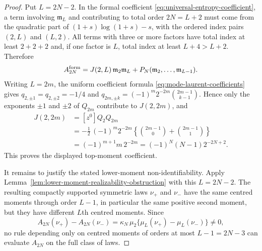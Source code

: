 \ifdefined\JFAArticleMain
{}
\else
\begin{proof}
Put \(L=2N-2\).  In the formal coefficient
\eqref{eq:universal-entropy-coefficient}, a term involving
\(\mathfrak m_L\) and contributing to total order \(2N=L+2\) must come from
the quadratic part of
\((1+s)\log(1+s)-s\), with the ordered index pairs \((2,L)\) and \((L,2)\).
All terms with three or more factors have total index at least \(2+2+2\) and,
if one factor is \(L\), total index at least \(L+4> L+2\).  Therefore
\[
  A_{2N}^{\rm form}
  =J(2,L)\,\mathfrak m_2\mathfrak m_L
  +P_N(\mathfrak m_2,\ldots,\mathfrak m_{L-1}).
\]
Writing \(L=2m\), the uniform coefficient formula
\eqref{eq:mode-laurent-coefficients} gives
\(q_{2,\pm1}=q_{2,\pm2}=-1/4\) and
\(q_{2m,\pm k}=(-1)^m2^{-2m}\binom{2m-1}{k-1}\).  Hence only the exponents
\(\pm1\) and \(\pm2\) of \(Q_{2m}\) contribute to \(J(2,2m)\), and
\[
\begin{aligned}
J(2,2m)
&=[z^0]Q_2Q_{2m}  \\
&=-\frac12\,(-1)^m2^{-2m}
\left\{\binom{2m-1}{0}+\binom{2m-1}{1}\right\}  \\
&=(-1)^{m+1}m\,2^{-2m}
=(-1)^N(N-1)2^{-2N+2}.
\end{aligned}
\]
This proves the displayed top-moment coefficient.

It remains to justify the stated lower-moment non-identifiability.  Apply
Lemma~\ref{lem:lower-moment-realizability-obstruction} with this
\(L=2N-2\).  The resulting compactly supported symmetric laws \(\nu_+\) and
\(\nu_-\) have the same centred moments through order \(L-1\), in particular
the same positive second moment, but they have different \(L\)th centred
moments.  Since
\[
  A_{2N}(\nu_+)-A_{2N}(\nu_-)
  =\kappa_N\,\mu_2\{\mu_L(\nu_+)-\mu_L(\nu_-)\}
  \ne0,
\]
no rule depending only on centred moments of orders at most \(L-1=2N-3\)
can evaluate \(A_{2N}\) on the full class of laws.
\end{proof}
\fi

